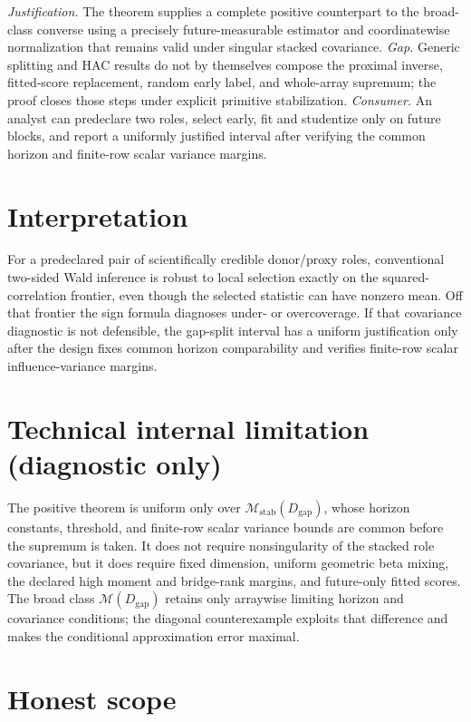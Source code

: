 \documentclass{article}
\begin{document}
\par\smallskip\noindent \textit{Justification.} The theorem supplies a complete positive counterpart to the broad-class converse using a precisely future-measurable estimator and coordinatewise normalization that remains valid under singular stacked covariance. \textit{Gap.} Generic splitting and HAC results do not by themselves compose the proximal inverse, fitted-score replacement, random early label, and whole-array supremum; the proof closes those steps under explicit primitive stabilization. \textit{Consumer.} An analyst can predeclare two roles, select early, fit and studentize only on future blocks, and report a uniformly justified interval after verifying the common horizon and finite-row scalar variance margins.

\section{Interpretation}

For a predeclared pair of scientifically credible donor/proxy roles, conventional two-sided Wald inference is robust to local selection exactly on the squared-correlation frontier, even though the selected statistic can have nonzero mean. Off that frontier the sign formula diagnoses under- or overcoverage. If that covariance diagnostic is not defensible, the gap-split interval has a uniform justification only after the design fixes common horizon comparability and verifies finite-row scalar influence-variance margins.

\section*{Technical internal limitation (diagnostic only)}

The positive theorem is uniform only over \(\mathcal M_{\mathrm{stab}}(D_{\mathrm{gap}})\), whose horizon constants, threshold, and finite-row scalar variance bounds are common before the supremum is taken. It does not require nonsingularity of the stacked role covariance, but it does require fixed dimension, uniform geometric beta mixing, the declared high moment and bridge-rank margins, and future-only fitted scores. The broad class \(\mathcal M(D_{\mathrm{gap}})\) retains only arraywise limiting horizon and covariance conditions; the diagonal counterexample exploits that difference and makes the conditional approximation error maximal.

\section{Honest scope}
\end{document}
